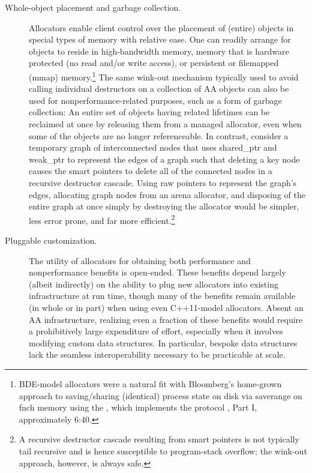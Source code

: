\begin{description}
\item[Whole-object placement and garbage collection.] Allocators enable client control
over the placement of (entire) objects in special types of memory with relative ease.
One can readily arrange for objects to reside in high-bandwidth memory, memory
that is hardware protected (no read and/or write access), or persistent or
filemapped (mmap) memory.\footnote{BDE-model allocators were a natural fit with Bloomberg’s home-grown approach to saving/sharing
(identical) process state on disk via saverange on fnch memory using the , which
implements the  protocol \cite{lakos17b}, Part I, approximately 6:40.}
The same wink-out mechanism typically used to avoid
calling individual destructors on a collection of AA objects can also be used
for nonperformance-related purposes, such as a form of garbage collection: An entire set of
objects having related lifetimes can be reclaimed at once by releasing them from a
managed allocator, even when some of the objects are no longer referenceable. In
contrast, consider a temporary graph of interconnected nodes that uses shared_ptr
and weak_ptr to represent the edges of a graph such that deleting a key node
causes the smart pointers to delete all of the connected nodes in a recursive
destructor cascade. Using raw pointers to represent the graph’s edges, allocating
graph nodes from an arena allocator, and disposing of the entire graph at once
simply by destroying the allocator would be simpler, less error prone, and far more
efficient.\footnote{A recursive destructor cascade resulting from smart pointers is not typically tail recursive and is
hence susceptible to program-stack overflow; the wink-out approach, however, is always safe.}

\item[Pluggable customization.] The utility of allocators for obtaining both performance
and nonperformance benefits is open-ended. These benefits depend largely (albeit
indirectly) on the ability to plug new allocators into existing infrastructure at run
time, though many of the benefits remain available (in whole or in part) when using
even C++11-model allocators. Absent an AA infrastructure, realizing even a fraction
of these benefits would require a prohibitively large expenditure of effort, especially
when it involves modifying custom data structures. In particular, bespoke data
structures lack the seamless interoperability necessary to be practicable at scale.

\end{description}

